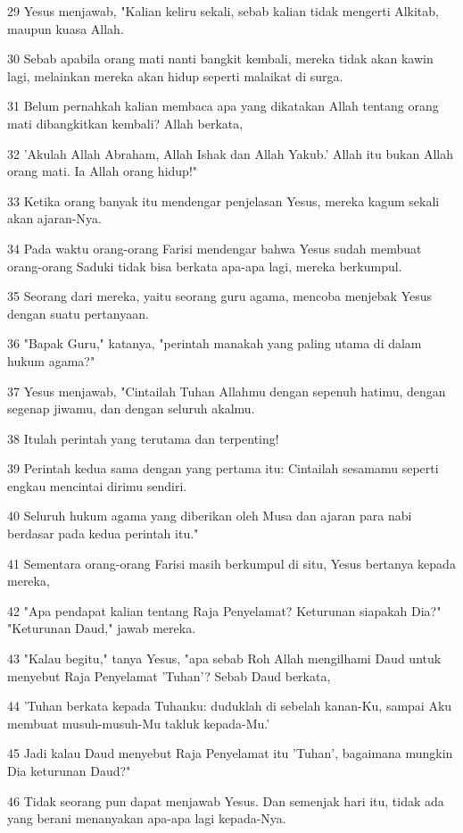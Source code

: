 \par 29 Yesus menjawab, "Kalian keliru sekali, sebab kalian tidak mengerti Alkitab, maupun kuasa Allah.
\par 30 Sebab apabila orang mati nanti bangkit kembali, mereka tidak akan kawin lagi, melainkan mereka akan hidup seperti malaikat di surga.
\par 31 Belum pernahkah kalian membaca apa yang dikatakan Allah tentang orang mati dibangkitkan kembali? Allah berkata,
\par 32 'Akulah Allah Abraham, Allah Ishak dan Allah Yakub.' Allah itu bukan Allah orang mati. Ia Allah orang hidup!"
\par 33 Ketika orang banyak itu mendengar penjelasan Yesus, mereka kagum sekali akan ajaran-Nya.
\par 34 Pada waktu orang-orang Farisi mendengar bahwa Yesus sudah membuat orang-orang Saduki tidak bisa berkata apa-apa lagi, mereka berkumpul.
\par 35 Seorang dari mereka, yaitu seorang guru agama, mencoba menjebak Yesus dengan suatu pertanyaan.
\par 36 "Bapak Guru," katanya, "perintah manakah yang paling utama di dalam hukum agama?"
\par 37 Yesus menjawab, "Cintailah Tuhan Allahmu dengan sepenuh hatimu, dengan segenap jiwamu, dan dengan seluruh akalmu.
\par 38 Itulah perintah yang terutama dan terpenting!
\par 39 Perintah kedua sama dengan yang pertama itu: Cintailah sesamamu seperti engkau mencintai dirimu sendiri.
\par 40 Seluruh hukum agama yang diberikan oleh Musa dan ajaran para nabi berdasar pada kedua perintah itu."
\par 41 Sementara orang-orang Farisi masih berkumpul di situ, Yesus bertanya kepada mereka,
\par 42 "Apa pendapat kalian tentang Raja Penyelamat? Keturunan siapakah Dia?" "Keturunan Daud," jawab mereka.
\par 43 "Kalau begitu," tanya Yesus, "apa sebab Roh Allah mengilhami Daud untuk menyebut Raja Penyelamat 'Tuhan'? Sebab Daud berkata,
\par 44 'Tuhan berkata kepada Tuhanku: duduklah di sebelah kanan-Ku, sampai Aku membuat musuh-musuh-Mu takluk kepada-Mu.'
\par 45 Jadi kalau Daud menyebut Raja Penyelamat itu 'Tuhan', bagaimana mungkin Dia keturunan Daud?"
\par 46 Tidak seorang pun dapat menjawab Yesus. Dan semenjak hari itu, tidak ada yang berani menanyakan apa-apa lagi kepada-Nya.

